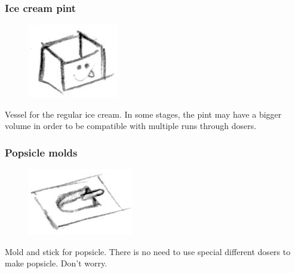 \documentclass[a4paper]{scrartcl}
\begin{document}
        \subsubsection{Ice cream pint}
            \begin{minipage}[t][2em][t]{\textwidth}
                \begin{figure}
                    \vspace{-15pt}
                    \includegraphics[scale=1]{devices/pint}
                    \vspace{-20pt}
                \end{figure}

                Vessel for the regular ice cream. In some stages, the pint may have
                a bigger volume in order to be compatible with multiple runs through
                dosers.
            \end{minipage}

        \subsubsection{Popsicle molds}
            \begin{minipage}[t][3em][t]{\textwidth}
                \begin{figure}
                    \vspace{-15pt}
                    \includegraphics[scale=1]{devices/popsicle_molds}
                    \vspace{-25pt}
                \end{figure}

                Mold and stick for popsicle. There is no need to use special
                different dosers to make popsicle. Don't worry.
            \end{minipage}
\end{document}

